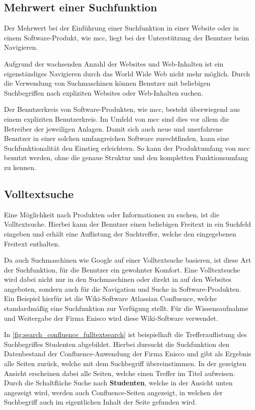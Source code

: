 \subsection{Mehrwert einer Suchfunktion\label{subsec2.3.1:Unterunterpunkt-1}}

Der Mehrwert bei der Einführung einer Suchfunktion in einer Website oder in einem Software-Produkt, wie \gls{mcc}, liegt bei der Unterstützung der Benutzer beim Navigieren.

Aufgrund der wachsenden Anzahl der Websites und Web-Inhalten \cite{GuyFawkes.2021} ist ein eigenständiges Navigieren durch das World Wide Web nicht mehr möglich. Durch die Verwendung von Suchmaschinen können Benutzer mit beliebigen Suchbegriffen nach expliziten Websites oder Web-Inhalten suchen.

Der Benutzerkreis von Software-Produkten, wie \gls{mcc}, besteht überwiegend aus einem expliziten Benutzerkreis. Im Umfeld von \gls{mcc} sind dies vor allem die Betreiber der jeweiligen Anlagen. Damit sich auch neue und unerfahrene Benutzer in einer solchen umfangreichen Software zurechtfinden, kann eine Suchfunktionalität den Einstieg erleichtern. So kann der Produktumfang von \gls{mcc} benutzt werden, ohne die genaue Struktur und den kompletten Funktionsumfang zu kennen.

\subsection{Volltextsuche\label{subsec2.3.2:Unterunterpunkt-2}}

Eine Möglichkeit nach Produkten oder Informationen zu suchen, ist die Volltextsuche. Hierbei kann der Benutzer einen beliebigen Freitext in ein Suchfeld eingeben und erhält eine Auflistung der Suchtreffer, welche den eingegebenen Freitext enthalten.

Da auch Suchmaschinen wie Google auf einer Volltextsuche basieren, ist diese Art der Suchfunktion, für die Benutzer ein gewohnter Komfort. Eine Volltextsuche wird dabei nicht nur in den Suchmaschinen oder direkt in auf den Websites angeboten, sondern auch für die Navigation und Suche in Software-Produkten. Ein Beispiel hierfür ist die Wiki-Software \glqq Atlassian Confluence\grqq{}, welche standardmäßig eine Suchfunktion zur Verfügung stellt. Für die Wissensaufnahme und Weitergabe der Firma Enisco wird diese Wiki-Software verwendet.

In \autoref{fig:search_confluence_fulltextsearch} ist beispielhaft die Trefferauflistung des Suchbegriffes \glqq Studenten\grqq{} abgebildet. Hierbei dursucht die Suchfunktion den Datenbestand der Confluence-Anwendung der Firma Enisco und gibt als Ergebnis alle Seiten zurück, welche mit dem Suchbegriff übereinstimmen. In der gezeigten Ansicht erscheinen dabei alle Seiten, welche einen Treffer im Titel aufweisen. Durch die Schaltfläche \glqq Suche nach \textbf{Studenten}\grqq{}, welche in der Ansicht unten angezeigt wird, werden auch Confluence-Seiten angezeigt, in welchen der Suchbegriff auch im eigentlichen Inhalt der Seite gefunden wird.

